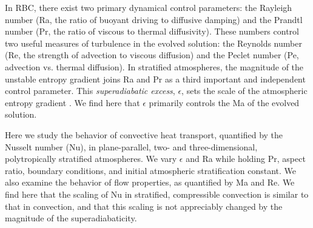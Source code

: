 In RBC, there exist two primary dynamical control parameters: the Rayleigh number (Ra, the ratio of buoyant driving to diffusive damping) and the Prandtl number (Pr, the ratio of viscous to thermal diffusivity). 
These numbers control two useful measures of turbulence in the evolved solution: the Reynolds number (Re, the strength of advection to viscous diffusion) and the Peclet number (Pe, advection vs. thermal diffusion).  
In stratified atmospheres, the magnitude of the unstable entropy gradient joins Ra and Pr as a third important and independent control parameter.  
This \emph{superadiabatic excess}, $\epsilon$, sets the scale of the atmospheric entropy gradient \cite{graham1975}.
We find here that $\epsilon$ primarily controls the Ma of the evolved solution.

Here we study the behavior of convective heat transport, quantified by the Nusselt number (Nu), in plane-parallel, two- and three-dimensional, polytropically stratified atmospheres.  
We vary $\epsilon$ and Ra while holding Pr, aspect ratio, boundary conditions, and initial atmospheric stratification constant.  
We also examine the behavior of flow properties, as quantified by Ma and Re.
We find here that the scaling of Nu in stratified, compressible convection is similar to that in \RB convection, and that this scaling is not appreciably changed by the magnitude of the superadiabaticity.

